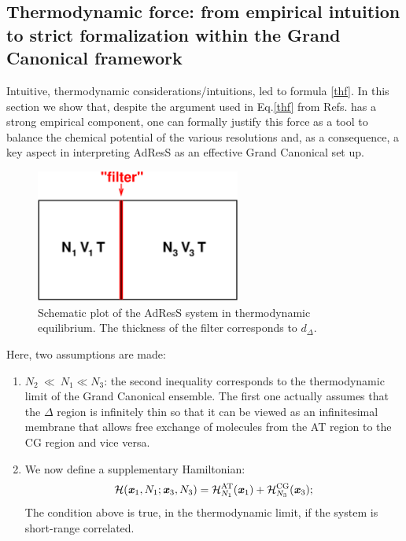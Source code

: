 \documentclass[aip,jcp,a4paper,reprint,onecolumn]{revtex4-1}
\newcommand{\vect}[1]{\textbf{\textit{#1}}}
\newcommand{\AT}{{\textrm{{AT}}}}
\newcommand{\CG}{{\textrm{CG}}}
\newcommand{\HY}{{\Delta}}
\begin{document}
\subsection{Thermodynamic force: from empirical intuition to strict formalization within the Grand Canonical framework}
Intuitive, thermodynamic considerations/intuitions, led to formula \eqref{thf}. In this section we show that, despite the argument used in Eq.\ref{thf} from Refs.\cite{prlgc,rdfcorr} has a strong empirical component, one can formally justify this force
as a tool to balance the chemical potential of the various resolutions and, as a consequence,  a key aspect in interpreting AdResS as an effective Grand Canonical set up. 
\begin{figure}
  \centering
  \begin{minipage}[t]{0.49\linewidth}
  \includegraphics[width=0.6\textwidth]{fig.grand/partition.eps}    
  \end{minipage}
  \caption{Schematic plot of the AdResS system in thermodynamic equilibrium. The thickness of the filter corresponds to $d_{\Delta}$.}
  \label{fig:tmp1}
\end{figure}
Here, two assumptions are made:
\begin{enumerate}\itemsep -1pt
\item $N_2\ {\ll}\ N_1 \ll N_3$: the second inequality corresponds to
  the thermodynamic limit of the Grand Canonical ensemble. The first
  one actually assumes that the $\HY$ region is infinitely thin so that it
  can be viewed as an infinitesimal membrane that allows free exchange of molecules from
  the AT region to the CG region and vice versa.
\item We now define a supplementary Hamiltonian:
  \begin{equation}
    \mathcal H(\vect x_1, N_1; \vect x_3, N_3) =
    \mathcal H_{N_1}^{\AT}(\vect x_1) + \mathcal H_{N_3}^{\CG}(\vect x_3); 
  \end{equation}
  The condition above is true, in the thermodynamic limit, if the system is
  short-range correlated.
\end{enumerate}
\end{document}
